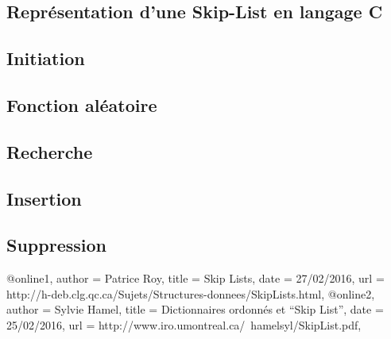 \documentclass[hidelinks,a4paper, 12pt]{article}
\begin{document}
	
	\begin{appendices}
	\newpage
	\section{Représentation d'une Skip-List en langage C}
	\subsection{Initiation}\label{SKInit}
	
	\subsection{Fonction aléatoire}\label{SKRandom}
	

	\subsection{Recherche}\label{SKSearch}
	

	\subsection{Insertion}\label{SKInsert}
	
	
	\subsection{Suppression}\label{SKDelete}
	
	\newpage
	\end{appendices}
	
	
	@online{1,
		author = {Patrice Roy},
		title = {Skip Lists},
		date = {27/02/2016},
		url = {http://h-deb.clg.qc.ca/Sujets/Structures-donnees/SkipLists.html},
	}
	@online{2,
		author = {Sylvie Hamel},
		title = {Dictionnaires ordonnés et “Skip List”},
		date = {25/02/2016},
		url = {http://www.iro.umontreal.ca/~hamelsyl/SkipList.pdf},
	}
	
\end{document}
